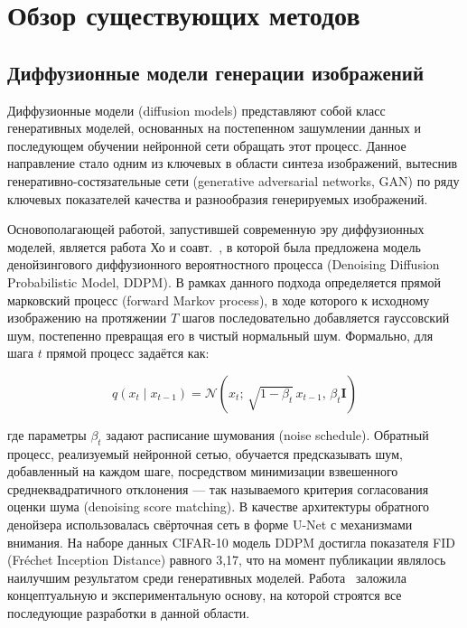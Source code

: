
\section{Обзор существующих методов}

\subsection{Диффузионные модели генерации изображений}

Диффузионные модели (diffusion models) представляют собой класс генеративных моделей, основанных на постепенном зашумлении данных и последующем обучении нейронной сети обращать этот процесс. Данное направление стало одним из ключевых в области синтеза изображений, вытеснив генеративно-состязательные сети (generative adversarial networks, GAN) по ряду ключевых показателей качества и разнообразия генерируемых изображений.

Основополагающей работой, запустившей современную эру диффузионных моделей, является работа Хо и соавт.~\cite{ho2020ddpm}, в которой была предложена модель денойзингового диффузионного вероятностного процесса (Denoising Diffusion Probabilistic Model, DDPM). В рамках данного подхода определяется прямой марковский процесс (forward Markov process), в ходе которого к исходному изображению на протяжении $T$ шагов последовательно добавляется гауссовский шум, постепенно превращая его в чистый нормальный шум. Формально, для шага $t$ прямой процесс задаётся как:

\begin{equation}
    q(x_t \mid x_{t-1}) = \mathcal{N}(x_t;\, \sqrt{1-\beta_t}\, x_{t-1},\, \beta_t \mathbf{I})
    \label{eq:ddpm_forward}
\end{equation}

где параметры $\beta_t$ задают расписание шумования (noise schedule). Обратный процесс, реализуемый нейронной сетью, обучается предсказывать шум, добавленный на каждом шаге, посредством минимизации взвешенного среднеквадратичного отклонения --- так называемого критерия согласования оценки шума (denoising score matching). В качестве архитектуры обратного денойзера использовалась свёрточная сеть в форме U-Net с механизмами внимания. На наборе данных CIFAR-10 модель DDPM достигла показателя FID (Fréchet Inception Distance) равного 3,17, что на момент публикации являлось наилучшим результатом среди генеративных моделей. Работа~\cite{ho2020ddpm} заложила концептуальную и экспериментальную основу, на которой строятся все последующие разработки в данной области.

